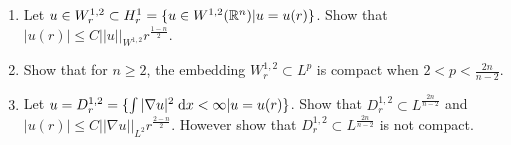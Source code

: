 \begin{enumerate}
\item Let $u \in W_r^{1, 2} \subset H_r^1 = \{ u \in W^{1, 2}(\mathbb{R}^n) | u = u(r) \}$.
  Show that $|u(r)| \leq C ||u||_{W^{1, 2}} r^{\frac{1 - n}{2}}$.

\item Show that for $n \geq 2$, the embedding $W_r^{1, 2} \subset L^p$ is compact when $2 < p < \frac{2 n}{n - 2}$.

\item Let $u = D_r^{1, 2} = \{ \int |\nabla u|^2 \;\mathrm{d}x < \infty | u = u(r) \}$.
  Show that $D_r^{1, 2} \subset L^{\frac{2 n}{n - 2}}$ and $|u(r)| \leq C ||\nabla u||_{L^2} r^{\frac{2 - n}{2}}$.
    However show that $D_r^{1, 2} \subset L^{\frac{2 n}{n - 2}}$ is not compact.
\end{enumerate}

